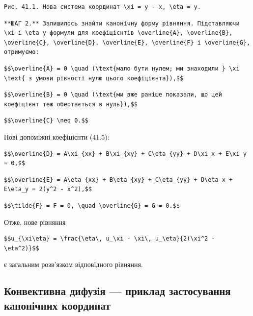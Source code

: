 \documentclass[
  ukrainian,
]{article}
\begin{document}
\begin{verbatim}
Рис. 41.1. Нова система координат \xi = y - x, \eta = y.
\end{verbatim}

\begin{verbatim}
**ШАГ 2.** Залишилось знайти канонічну форму рівняння. Підставляючи \xi і \eta у формули для коефіцієнтів \overline{A}, \overline{B}, \overline{C}, \overline{D}, \overline{E}, \overline{F} і \overline{G}, отримуємо:
\end{verbatim}

\begin{verbatim}
$$\overline{A} = 0 \quad (\text{мало бути нулем; ми знаходили } \xi \text{ з умови рівності нулю цього коефіцієнта}),$$
\end{verbatim}

\begin{verbatim}
$$\overline{B} = 0 \quad (\text{ми вже раніше показали, що цей коефіцієнт теж обертається в нуль}),$$
\end{verbatim}

\begin{verbatim}
$$\overline{C} \neq 0.$$
\end{verbatim}

Нові допоміжні коефіцієнти (41.5):

\begin{verbatim}
$$\overline{D} = A\xi_{xx} + B\xi_{xy} + C\eta_{yy} + D\xi_x + E\xi_y = 0,$$
\end{verbatim}

\begin{verbatim}
$$\overline{E} = A\eta_{xx} + B\eta_{xy} + C\eta_{yy} + D\eta_x + E\eta_y = 2(y^2 - x^2),$$
\end{verbatim}

\begin{verbatim}
$$\tilde{F} = F = 0, \quad \overline{G} = G = 0.$$
\end{verbatim}

Отже, нове рівняння

\begin{verbatim}
$$u_{\xi\eta} = \frac{\eta\, u_\xi - \xi\, u_\eta}{2(\xi^2 - \eta^2)}$$
\end{verbatim}

є загальним розв'язком відповідного рівняння.

\subsection{Конвективна дифузія --- приклад застосування канонічних
координат}\label{ux43aux43eux43dux432ux435ux43aux442ux438ux432ux43dux430-ux434ux438ux444ux443ux437ux456ux44f-ux43fux440ux438ux43aux43bux430ux434-ux437ux430ux441ux442ux43eux441ux443ux432ux430ux43dux43dux44f-ux43aux430ux43dux43eux43dux456ux447ux43dux438ux445-ux43aux43eux43eux440ux434ux438ux43dux430ux442}
\end{document}
